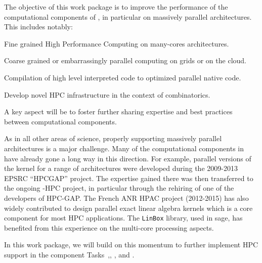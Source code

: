 \begin{workpackage}[id=hpc,wphases=0-48,
  title=High Performance Mathematical Computing,
  lead=UJF,
  PSRM=1, %
  LLRM=12, %
  SARM=18, %
  UKRM=1, %
  UBRM=1, %
  UJFRM=24] %
  

\begin{wpobjectives}
  The objective of this work package is to improve the performance of
  the computational components of \TheProject, in particular on
  massively parallel architectures. This includes notably:
  \begin{compactitem}
  \item Fine grained High Performance Computing on many-cores architectures.
  \item Coarse grained or embarrassingly parallel computing on grids or on the cloud.
  \item Compilation of high level interpreted code to optimized parallel native code.
  \item Develop novel HPC infrastructure in the context of combinatorics.
  \end{compactitem}
  A key aspect will be to foster further sharing expertise and best
  practices between computational components.
\end{wpobjectives}

\begin{wpdescription}
  As in all other areas of science, properly supporting massively
  parallel architectures is a major challenge. Many of the
  computational components in \TheProject have already gone a long way
  in this direction. For example, parallel versions
  of the \GAP kernel for
  a range of architectures were developed during the 2009-2013 EPSRC
  ``HPCGAP'' project. The expertise
  gained there was then transferred to the ongoing \Singular-HPC
  project, in particular through the rehiring of one of the developers
  of HPC-GAP. The French ANR HPAC project (2012-2015) has also widely contributed to design
  parallel exact linear algebra kernels  which is a core component for most HPC
  applications. The \texttt{LinBox} library, used in sage, has benefited from this
  experience on the multi-core processing aspects. 

  In this work package, we will build on this momentum to further implement HPC support in
  the component Tasks~,,
  , and .



\end{wpdescription}
\end{workpackage}
